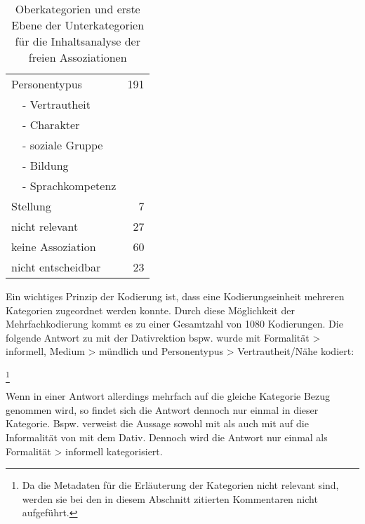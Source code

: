 \begin{table}
\begin{tabular}{ll|r}
\multicolumn{2}{l|}{Personentypus} & 191 \\ %
\textbf{} & - Vertrautheit &  \\ 
\textbf{} & - Charakter &  \\ 
\textbf{} & - soziale Gruppe &  \\ 
\textbf{} & - Bildung &  \\ 
\textbf{} & - Sprachkompetenz &  \\ \hline
\multicolumn{2}{l|}{Stellung} & 7 \\ \hline
\multicolumn{2}{l|}{nicht relevant} & 27 \\ \hline
\multicolumn{2}{l|}{keine Assoziation} & 60 \\ \hline
\multicolumn{2}{l|}{nicht entscheidbar} & 23 \\ 
\end{tabular}
\caption{Oberkategorien und erste Ebene der Unterkategorien für die Inhaltsanalyse der freien Assoziationen}
\label{table:KatsysAss}
\end{table}
Ein wichtiges Prinzip der Kodierung ist, dass eine Kodierungseinheit mehreren Kategorien zugeordnet werden konnte. 
Durch diese Möglichkeit der Mehrfachkodierung kommt es zu einer Gesamtzahl von 1080 Kodierungen. 
Die folgende Antwort zu \dank{} mit der Dativrektion bspw. wurde mit \glqq Formalität > informell\grqq, \glqq Medium > mündlich\grqq{} und \glqq Personentypus > Vertrautheit/Nähe\grqq{} kodiert: 
\begin{exe}
\ex {}\footnote{Da die Metadaten für die Erläuterung der Kategorien nicht relevant sind, werden sie bei den in diesem Abschnitt zitierten Kommentaren nicht aufgeführt.}
\end{exe}
Wenn in einer Antwort allerdings mehrfach auf die gleiche Kategorie Bezug genommen wird, so findet sich die Antwort dennoch nur einmal in dieser Kategorie. 
Bspw. verweist die Aussage  sowohl mit  als auch mit  auf die Informalität von \dank{} mit dem Dativ. 
Dennoch wird die Antwort nur einmal als \glqq Formalität > informell\grqq{} kategorisiert.

